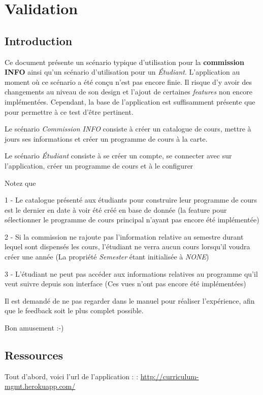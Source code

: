 \chapter{Validation}
\label{validation}
\section{Introduction}
\label{introduction_val}
Ce document présente un scénario typique d'utilisation pour la \textbf{commission INFO} ainsi qu'un scénario d'utilisation pour un \textit{Étudiant}. L'application au moment où ce scénario a été conçu n'est pas encore finie. Il risque d'y avoir des changements au niveau de son design et l'ajout de certaines \textit{features} non encore implémentées. Cependant, la base de l'application est suffisamment présente que pour permettre à ce test d’être pertinent.

Le scénario \textit{Commission INFO} consiste à créer un catalogue de cours, mettre à jours ses informations et créer un programme de cours à la carte. 

Le scénario \textit{Étudiant} consiste à se créer un compte, se connecter avec sur l'application, créer un programme de cours et à le configurer 

Notez que 

1 - Le catalogue présenté aux étudiants pour construire leur programme de cours est le dernier en date à voir été créé en base de donnée (la feature pour sélectionner le programme de cours principal n'ayant pas encore été implémentée)

2 - Si la commission ne rajoute pas l'information relative au semestre durant lequel sont dispensés les cours, l'étudiant ne verra aucun cours lorsqu'il voudra créer une année (La propriété \textit{Semester} étant initialisée à \textit{NONE})
\label{note2}

3 - L'étudiant ne peut pas accéder aux informations relatives au programme qu'il veut suivre depuis son interface (Ces vues n'ont pas encore été implémentées)

Il est demandé de ne pas regarder dans le manuel pour réaliser l'expérience, afin que le feedback soit le plus complet possible.

Bon amusement :-)

\section{Ressources}
Tout d’abord, voici l'url de l'application : : \url{http://curriculum-mgmt.herokuapp.com/} 

